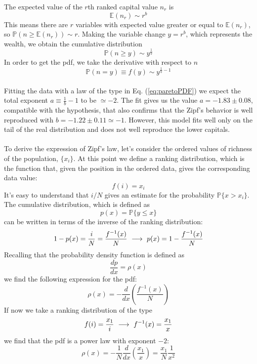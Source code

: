 The expected value of the $r$th ranked capital value $n_r$ is
\begin{equation*}
    \mathbb{E}(n_r)\sim r^b
\end{equation*}
This means there are $r$ variables with expected value greater or equal to $\mathbb{E}(n_r)$, so $\mathbb{P}(n \geq \mathbb{E}(n_r)) \sim r$.
Making the variable change $y=r^b$, which represents the wealth, we obtain the cumulative distribution
\begin{equation*}
    \mathbb{P}(n \geq y) \sim y^{\frac{1}{b}}
\end{equation*}
In order to get the pdf, we take the derivative with respect to $n$
\begin{equation}
    \mathbb{P}(n = y) \equiv f(y) \sim y^{\frac{1}{b} - 1}
    \label{eq:paretoPDF}
\end{equation}
\\Fitting the data with a law of the type in Eq. (\ref{eq:paretoPDF}) we expect the total exponent $a \equiv \frac{1}{b} - 1$ to be $\simeq -2$.
The fit gives us the value $a = -1.83 \pm 0.08$, compatible with the hypothesis, that also confirms that the Zipf's behavior is well reproduced with $b = -1.22 \pm 0.11 \simeq -1$.
However, this model fits well only on the tail of the real distribution and does not well reproduce the lower capitals. \\ \\
To derive the expression of Zipf's law, let's consider the ordered values of richness of the population, $\{x_i\}$. At this point we define a ranking distribution, which is the function that, given the position in the ordered data, gives the corresponding data value:
\begin{equation}
	f(i) = x_i	
\end{equation}
It's easy to understand that $i/N$ gives an estimate for the probability $\mathbb{P}\{x > x_i\}$. The cumulative distribution, which is defined as
$$
	p(x) = \mathbb{P}\{y \leq x\}
$$
can be written in terms of the inverse of the ranking distribution:
\begin{equation}
	1 - p(x) = \frac{i}{N} = \frac{f^{-1}(x)}{N} \ \longrightarrow \ p(x) = 1 - \frac{f^{-1}(x)}{N}	
\end{equation}
Recalling that the probability density function is defined as 
$$
	\frac{dp}{dx} = \rho(x)
$$
we find the following expression for the pdf:
\begin{equation}
	\rho(x) = -\frac{d}{dx} \left(\frac{f^{-1}(x)}{N}\right)	
\end{equation}
If now we take a ranking distribution of the type
$$
	f(i) = \frac{x_1}{i} \ \longrightarrow \ f^{-1}(x) = \frac{x_1}{x}	
$$
we find that the pdf is a power law with exponent $-2$:
\begin{equation}
	\rho(x) = -\frac{1}{N}\frac{d}{dx}\left(\frac{x_1}{x}\right) = \frac{x_1}{N}\frac{1}{x^2}	
\end{equation}
